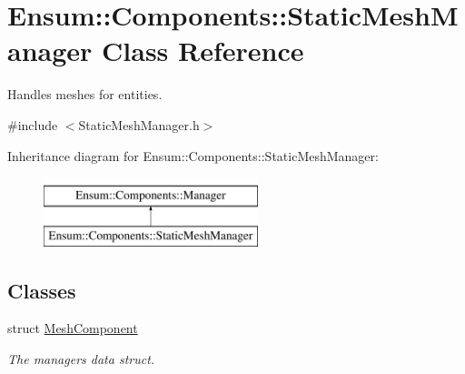 \hypertarget{class_ensum_1_1_components_1_1_static_mesh_manager}{}\section{Ensum\+:\+:Components\+:\+:Static\+Mesh\+Manager Class Reference}
\label{class_ensum_1_1_components_1_1_static_mesh_manager}


Handles meshes for entities.  




{\ttfamily \#include $<$Static\+Mesh\+Manager.\+h$>$}

Inheritance diagram for Ensum\+:\+:Components\+:\+:Static\+Mesh\+Manager\+:\begin{figure}[H]
\begin{center}
\leavevmode
\includegraphics[height=2.000000cm]{class_ensum_1_1_components_1_1_static_mesh_manager}
\end{center}
\end{figure}
\subsection*{Classes}
\begin{DoxyCompactItemize}
\item 
struct \hyperlink{struct_ensum_1_1_components_1_1_static_mesh_manager_1_1_mesh_component}{Mesh\+Component}
\begin{DoxyCompactList}\small\item\em The managers data struct. \end{DoxyCompactList}\end{DoxyCompactItemize}
